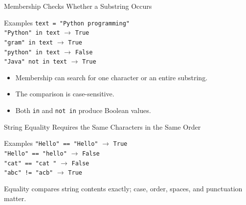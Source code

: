 \documentclass[aspectratio=169,10pt]{beamer}
\begin{document}
\begin{frame}{Membership Checks Whether a Substring Occurs}
  \begin{block}{Examples}
    \texttt{text = "Python programming"}\\[0.08in]
    \texttt{"Python" in text} $\longrightarrow$ \texttt{True}\\
    \texttt{"gram" in text} $\longrightarrow$ \texttt{True}\\
    \texttt{"python" in text} $\longrightarrow$ \texttt{False}\\
    \texttt{"Java" not in text} $\longrightarrow$ \texttt{True}
  \end{block}

  \begin{itemize}
    \item Membership can search for one character or an entire substring.
    \item The comparison is case-sensitive.
    \item Both \texttt{in} and \texttt{not in} produce Boolean values.
  \end{itemize}
\end{frame}


\begin{frame}{String Equality Requires the Same Characters in the Same Order}
  \begin{block}{Examples}
    \texttt{"Hello" == "Hello"} $\longrightarrow$ \texttt{True}\\
    \texttt{"Hello" == "hello"} $\longrightarrow$ \texttt{False}\\
    \texttt{"cat" == "cat "} $\longrightarrow$ \texttt{False}\\
    \texttt{"abc" != "acb"} $\longrightarrow$ \texttt{True}
  \end{block}

  \begin{keyidea}
    Equality compares string contents exactly; case, order, spaces, and punctuation matter.
  \end{keyidea}
\end{frame}
\end{document}
